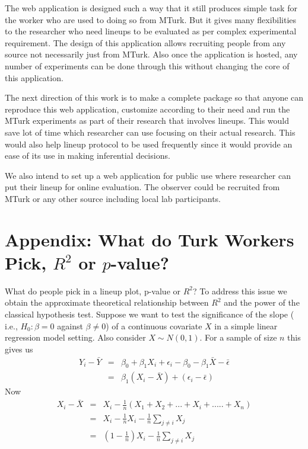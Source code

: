 \documentclass[11pt]{article}
\begin{document}
The web application is designed such a way that it still produces simple task for the worker who are used to doing so from MTurk. But it gives many flexibilities to the researcher who need lineups to be evaluated as per complex experimental requirement. The design of this application allows recruiting people from any source not necessarily just from MTurk. Also once the application is hosted, any number of experiments can be done through this without changing the core of this application.

The next direction of this work is to make a complete package so that anyone can reproduce this web application, customize according to their need and run the MTurk experiments as part of their research that involves lineups. This would save lot of time which researcher can use focusing on their actual research. This would also help lineup protocol to be used frequently since it would provide an ease of its use in making inferential decisions.

We also intend to set up a web application for public use where researcher can put their lineup for online evaluation. The observer could be recruited from MTurk or any other source including local lab participants. 



\section{Appendix: What do Turk Workers Pick, $R^2$ or $p$-value?} What do people pick in a lineup plot, p-value or $R^2$? To address this issue we obtain the approximate theoretical relationship between $R^2$ and the power of the classical hypothesis test. Suppose we want to test the significance of the slope ( i.e.,  $H_0: \beta=0$ against $\beta \ne 0$) of a continuous covariate $X$ in  a simple linear regression model setting. Also consider $X \sim N(0,1)$. For a sample of size $n$ this gives us 
\begin{eqnarray*}
Y_i-\bar{Y}& = & \beta_0+\beta_1X_i+\epsilon_i - \beta_0 - \beta_1 \bar{X}- \bar{\epsilon} \\
          & = & \beta_1(X_i-\bar{X})+(\epsilon_i-\bar{\epsilon})
\end{eqnarray*}
Now 
\begin{eqnarray*}
X_i-\bar{X}& = & X_i - \frac1n (X_1 + X_2 + ... + X_i + .....+ X_n) \\
          & = & X_i - \frac1n X_i - \frac1n \sum_{j \neq i}{X_j}\\
          & = & (1-\frac1n)X_i - \frac1n \sum_{j \neq i}{X_j}
\end{eqnarray*}
\end{document}
